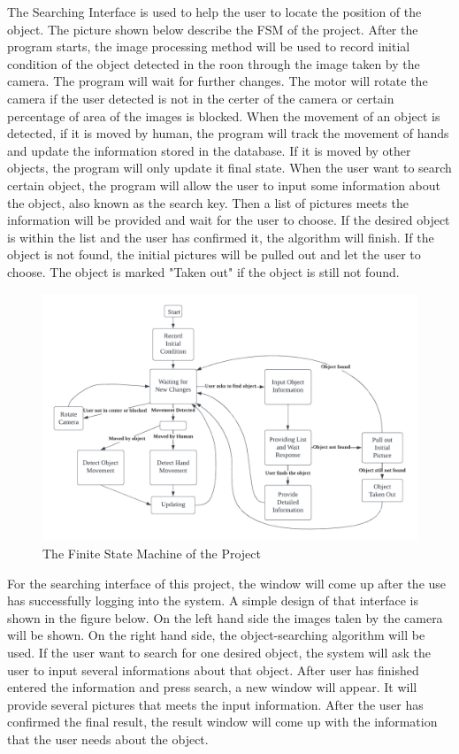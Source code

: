 \documentclass[12pt, titlepage]{article}
\begin{document}
The Searching Interface is used to help the user to locate the position of the object. The picture shown below describe the FSM of the project. After the program starts, the image processing method will be used to record initial condition of the object detected in the roon through the image taken by the camera. The program will wait for further changes. The motor will rotate the camera if the user detected is not in the certer of the camera or certain percentage of area of the images is blocked. When the movement of an object is detected, if it is moved by human, the program will track the movement of hands and update the information stored in the database. If it is moved by other objects, the program will only update it final state. When the user want to search certain object, the program will allow the user to input some information about the object, also known as the search key. Then a list of pictures meets the information will be provided and wait for the user to choose. If the desired object is within the list and the user has confirmed it, the algorithm will finish. If the object is not found, the initial pictures will be pulled out and let the user to choose. The object is marked "Taken out" if the object is still not found. 

\begin{figure}[H]
    \centering
    \includegraphics[scale=0.8]{FSM.png}
    \caption{The Finite State Machine of the Project}
\end{figure}

For the searching interface of this project, the window will come up after the use has successfully logging into the system. A simple design of that interface is shown in the figure below. On the left hand side the images talen by the camera will be shown. On the right hand side, the object-searching algorithm will be used. If the user want to search for one desired object, the system will ask the user to input several informations about that object. After user has finished entered the information and press search, a new window will appear. It will provide several pictures that meets the input information. After the user has confirmed the final result, the result window will come up with the information that the user needs about the object. 
\end{document}
